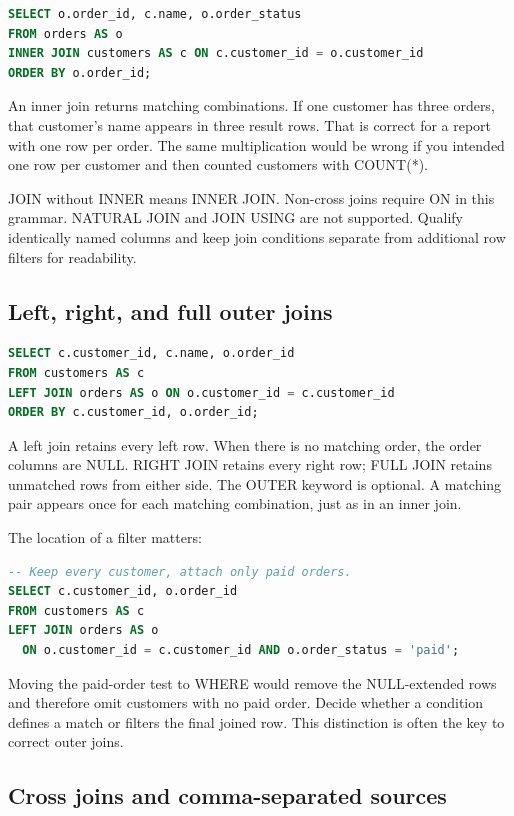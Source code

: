 \begin{lstlisting}[language=SQL]
SELECT o.order_id, c.name, o.order_status
FROM orders AS o
INNER JOIN customers AS c ON c.customer_id = o.customer_id
ORDER BY o.order_id;
\end{lstlisting}

An inner join returns matching combinations. If one customer has three orders, that customer's name appears in three result rows. That is correct for a report with one row per order. The same multiplication would be wrong if you intended one row per customer and then counted customers with COUNT(*).

JOIN without INNER means INNER JOIN. Non-cross joins require ON in this grammar. NATURAL JOIN and JOIN USING are not supported. Qualify identically named columns and keep join conditions separate from additional row filters for readability.

\subsection{Left, right, and full outer joins}

\begin{lstlisting}[language=SQL]
SELECT c.customer_id, c.name, o.order_id
FROM customers AS c
LEFT JOIN orders AS o ON o.customer_id = c.customer_id
ORDER BY c.customer_id, o.order_id;
\end{lstlisting}

A left join retains every left row. When there is no matching order, the order columns are NULL. RIGHT JOIN retains every right row; FULL JOIN retains unmatched rows from either side. The OUTER keyword is optional. A matching pair appears once for each matching combination, just as in an inner join.

The location of a filter matters:

\begin{lstlisting}[language=SQL]
-- Keep every customer, attach only paid orders.
SELECT c.customer_id, o.order_id
FROM customers AS c
LEFT JOIN orders AS o
  ON o.customer_id = c.customer_id AND o.order_status = 'paid';
\end{lstlisting}

Moving the paid-order test to WHERE would remove the NULL-extended rows and therefore omit customers with no paid order. Decide whether a condition defines a match or filters the final joined row. This distinction is often the key to correct outer joins.

\subsection{Cross joins and comma-separated sources}

